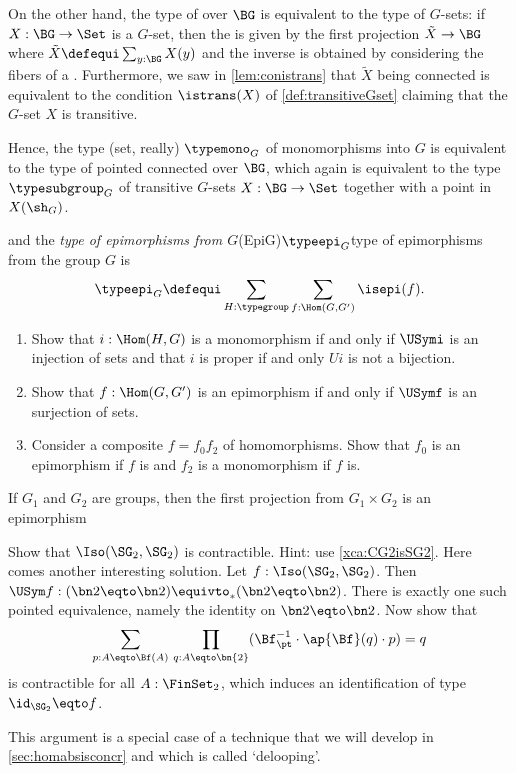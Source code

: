On the other hand,  the type of \coverings over $\BG$ is equivalent to the type of $G$-sets: if $X:\BG\to\Set$ is a $G$-set, then the \covering is given by the first projection $\tilde X\to \BG$ where $\tilde X\defequi\sum_{y:\BG}X(y)$ and the inverse is obtained by considering the fibers of a \covering.  Furthermore, we saw in \cref{lem:conistrans} that $\tilde X$ being connected is equivalent to the condition $\istrans(X)$ of \cref{def:transitiveGset} claiming that the $G$-set $X$ is transitive.

Hence, the type (set, really) $\typemono_G$ of monomorphisms into $G$ is equivalent to the type of pointed connected \coverings over $\BG$, which again is equivalent to the type $\typesubgroup_G$ of transitive $G$-sets $X:\BG\to\Set$ together with a point in $X(\sh_G)$.

and the \emph{type of epimorphisms from $G$}\glossary(EpiG){$\protect{\typeepi_G}$}{type of epimorphisms from the group $G$} is
  $$\typeepi_G\defequi\sum_{H:\typegroup}\sum_{f:\Hom(G,G')}\isepi(f).$$
  
  
  \begin{exercise}
      \begin{enumerate}
      \item Show that $i:\Hom(H,G)$ is a monomorphism if and only if $\USymi$ is an injection of sets and that $i$ is proper if and only $Ui$ is not a bijection.
      \item Show that $f:\Hom(G,G')$ is an epimorphism if and only if $\USymf$ is an surjection of sets.
      \item Consider a composite $f=f_0f_2$ of homomorphisms.  Show that $f_0$ is an epimorphism if $f$ is and $f_2$ is a monomorphism if $f$ is.\qedhere
      \end{enumerate}
    \end{exercise}
    
    If $G_1$ and $G_2$ are groups, then the first projection from $G_1\times G_2$ is an epimorphism 

\begin{xca}
  \label{xca:SG2=SG2contractible} 
  Show that $\Iso(\SG_2,\SG_2)$ is contractible. Hint: use
  \cref{xca:CG2isSG2}. Here comes another interesting solution.
  Let $f:\Iso(\SG_2,\SG_2)$. Then $\USym f: (\bn2\eqto\bn2)\equivto_*
  (\bn2\eqto\bn2)$. There is exactly one such pointed equivalence,
  namely the identity on $\bn2\eqto\bn2$. Now show that 
  \[
  \sum_{p:A\eqto \Bf(A)}\,\prod_{q: A\eqto\bn{2}} 
  (\Bf^{-1}_\pt\cdot \ap{\Bf}(q)\cdot p) = q
  \]
  is contractible for all $A:\FinSet_2$, which induces an
  identification of type $\id_{\SG_2}\eqto f$.
  
  This argument is a special case of a technique that we
  will develop in \cref{sec:homabsisconcr} and which is called `delooping'.
\end{xca}


